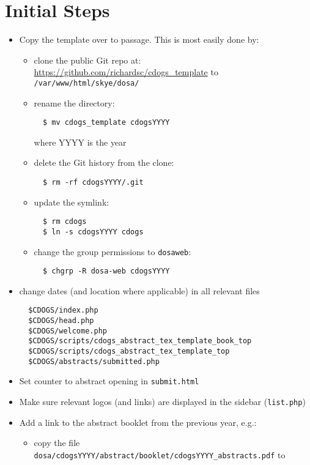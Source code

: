 \documentclass[letterpaper,12pt]{article}
\begin{document}
\section{Initial Steps}\label{s:initial}

\begin{itemize}
\item Copy the template over to passage. This is most easily done by:
  \begin{itemize}
  \item clone the public Git repo at: 
    \url{https://github.com/richardsc/cdogs_template} to \verb|/var/www/html/skye/dosa/|
  \item rename the directory:
\begin{verbatim}
  $ mv cdogs_template cdogsYYYY
\end{verbatim}
    where YYYY is the year
  \item delete the Git history from the clone:
\begin{verbatim}
  $ rm -rf cdogsYYYY/.git
\end{verbatim}
  \item update the symlink:
\begin{verbatim}
  $ rm cdogs
  $ ln -s cdogsYYYY cdogs
\end{verbatim}
  \item change the group permissions to \verb|dosaweb|:
\begin{verbatim}
  $ chgrp -R dosa-web cdogsYYYY
\end{verbatim}
  \end{itemize}
\item change dates (and location where applicable) in all relevant files
  \vspace{-1em}
\begin{verbatim}
  $CDOGS/index.php
  $CDOGS/head.php
  $CDOGS/welcome.php
  $CDOGS/scripts/cdogs_abstract_tex_template_book_top
  $CDOGS/scripts/cdogs_abstract_tex_template_top
  $CDOGS/abstracts/submitted.php
\end{verbatim}
\item Set counter to abstract opening in \verb|submit.html|
\item Make sure relevant logos (and links) are displayed in the
  sidebar (\verb|list.php|)
\item Add a link to the abstract booklet from the previous year, e.g.:
  \begin{itemize}
  \item copy the file
    \verb|dosa/cdogsYYYY/abstract/booklet/cdogsYYYY_abstracts.pdf| to

\end{itemize}
\end{itemize}
\end{document}
